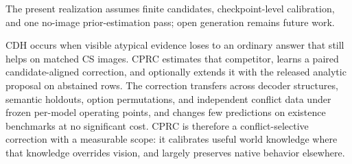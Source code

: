 \documentclass[letterpaper]{article}
\begin{document}
The present realization assumes finite candidates,
checkpoint-level calibration, and one no-image prior-estimation pass;
open generation remains future work.

CDH occurs when visible atypical evidence loses to an ordinary answer that still
helps on matched CS images. CPRC estimates that competitor, learns a paired
candidate-aligned correction, and optionally extends it with the released
analytic proposal on abstained rows. The correction transfers across decoder
structures, semantic holdouts, option permutations, and independent conflict
data under frozen per-model operating points, and changes few
predictions on
existence benchmarks at no significant cost. CPRC is therefore a conflict-selective
correction with a measurable scope: it calibrates useful
world knowledge where that knowledge overrides vision, and largely preserves
native behavior elsewhere.


\end{document}
